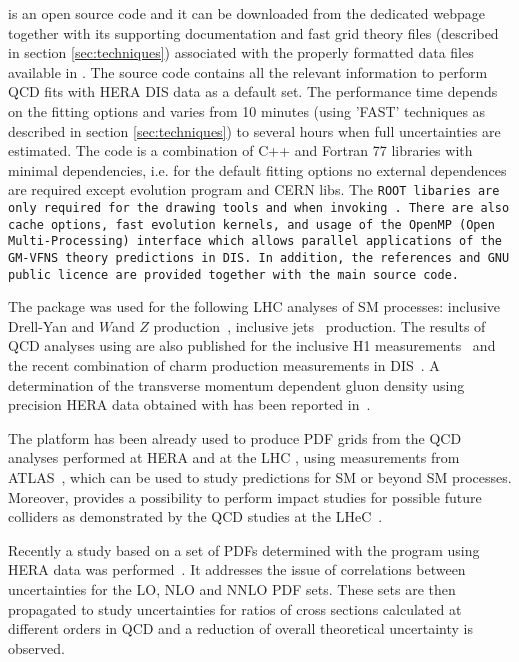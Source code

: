
\fitter is an open source code and it can be downloaded from the dedicated webpage \cite{herafitter:page}
together with its supporting documentation and 
fast grid theory files (described in section \ref{sec:techniques}) associated with the properly formatted data files available in \fitter.
The source code contains all the relevant information to perform QCD fits with HERA DIS data as a default set. The performance time depends on the fitting options and varies from 10 minutes 
(using 'FAST' techniques as described in section \ref{sec:techniques}) to several hours when full uncertainties are estimated. The \fitter code is a combination of C++ and Fortran 77 libraries with minimal 
dependencies, i.e. for the default fitting options no external dependences are required  except \qcdnum evolution program \cite{qcdnum} and CERN libs. The \tt ROOT \rm  libaries are only required for the drawing tools and when invoking \applgrid\rm.  
There are also cache options, fast evolution kernels, and usage of the OpenMP (Open Multi-Processing)  interface which allows parallel applications of the GM-VFNS theory predictions in DIS. 
In addition, the \fitter references and GNU public licence are provided 
together with the main source code. 


The \fitter package was used for the following LHC analyses of SM processes:
inclusive Drell-Yan and $W$and $Z$ 
production~\cite{atlas:strange,atlas:hm,cms:strange},
inclusive jets~\cite{atlas:jets} production.
The results of QCD analyses using \fitter are also
published for the inclusive H1 measurements~\cite{h1:2012kk}
and the recent combination of charm production measurements 
in DIS~\cite{h1zeus:charm}.
A determination of the transverse momentum dependent gluon density using precision HERA data obtained with \fitter has been reported in~\cite{Jung2014}. 


The \fitter platform has been already used to produce PDF grids 
from the QCD analyses performed at 
HERA \cite{h1zeus:2009wt,hera:grids} and at the LHC \cite{atlas:grids}, using 
measurements from ATLAS~\cite{atlas:strange,atlas:jets}, which can be used to study predictions for SM or beyond SM processes.  Moreover, \fitter provides a possibility to 
perform impact studies for possible future colliders
as demonstrated by the QCD studies at the LHeC~\cite{lhec:studies}.

Recently a study based on a set of PDFs 
determined with the \fitter program using HERA data was performed~\cite{hfcorrpaper}. It addresses the issue of correlations between uncertainties for the LO,
NLO and NNLO PDF sets. These sets are then propagated to study uncertainties 
for ratios of cross sections calculated at different orders in QCD and  
a reduction of overall theoretical uncertainty is observed.







